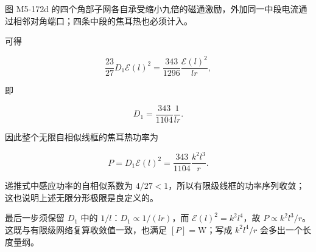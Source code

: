 图 M5-172d
的四个角部子网各自承受缩小九倍的磁通激励，外加同一中段电流通过相邻对角端口；四条中段的焦耳热也必须计入。

可得

\[
\frac{23}{27}D_1\mathcal E(l)^2
=\frac{343}{1296}\frac{\mathcal E(l)^2}{lr},
\]

即

\[
D_1=\frac{343}{1104}\frac1{lr}.
\]

因此整个无限自相似线框的焦耳热功率为

\[
\boxed{
P=D_1\mathcal E(l)^2
=\frac{343}{1104}\frac{k^2l^3}{r}}.
\]

递推式中感应功率的自相似系数为
\(4/27<1\)，所以有限级线框的功率序列收敛；这也说明上述无限分形极限是良定义的。

最后一步须保留 \(D_1\) 中的 \(1/l\)：\(D_1\propto1/(lr)\)，而
\(\mathcal E(l)^2=k^2l^4\)，故
\(P\propto k^2l^3/r\)。这既与有限级网络复算收敛值一致，也满足
\([P]=\mathrm W\)；写成 \(k^2l^4/r\) 会多出一个长度量纲。
\clearpage
\endgroup
